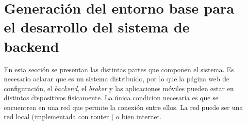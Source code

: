 \section{Generación del entorno base para el desarrollo del sistema de backend}
 En esta sección se presentan las distintas partes que componen el sistema.
 Es necesario aclarar que es un sistema distribuido, por lo que la página web de configuración, el \textit{backend}, el \textit{broker} y las aplicaciones móviles pueden estar en distintos dispositivos fisicamente. La única condicion necesaria es que se encuentren en una red que permite la conexión entre ellos. La red puede ser una red local (implementada con router ) o bien internet.








	
		

		
		
